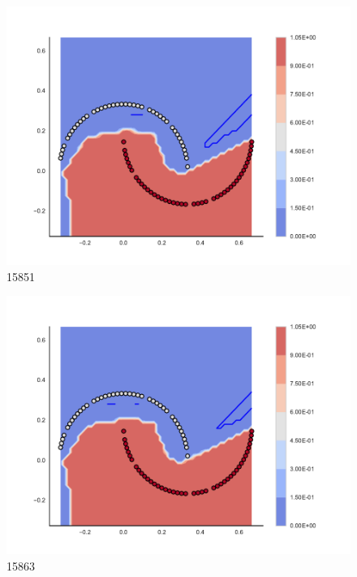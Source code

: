 \begin{subfigure}[b]{0.09\textwidth}
    \includegraphics[clip, trim=2.35cm 1.75cm 4.5cm 0cm,width=\textwidth]{img/convergence/15851.pdf}
    \caption{15851}
    \label{fig:convergence_15851}
\end{subfigure}
%
\begin{subfigure}[b]{0.09\textwidth}
    \includegraphics[clip, trim=2.35cm 1.75cm 4.5cm 0cm,width=\textwidth]{img/convergence/15863.pdf}
    \caption{15863}
    \label{fig:convergence_15863}
\end{subfigure}
%
